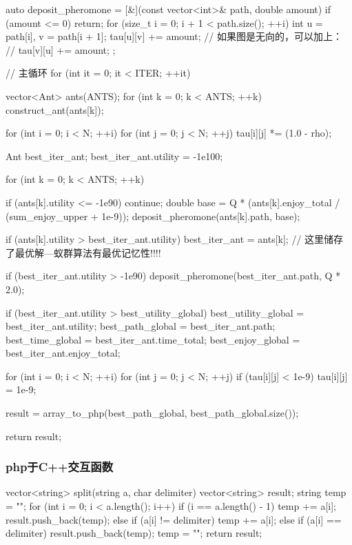 \documentclass[withoutpreface,bwprint]{cumcmthesis} %
\begin{document}
\begin{appendices}
\begin{tcode}
{    auto deposit_pheromone = [&](const vector<int>& path, double amount) {
        if (amount <= 0) return;
        for (size_t i = 0; i + 1 < path.size(); ++i) {
            int u = path[i], v = path[i + 1];
            tau[u][v] += amount;
            // 如果图是无向的，可以加上：
            // tau[v][u] += amount;
        }
        };

    // 主循环
    for (int it = 0; it < ITER; ++it) {
        vector<Ant> ants(ANTS);
        for (int k = 0; k < ANTS; ++k) {
            construct_ant(ants[k]);
        }

        for (int i = 0; i < N; ++i)
            for (int j = 0; j < N; ++j)
                tau[i][j] *= (1.0 - rho);

        Ant best_iter_ant;
        best_iter_ant.utility = -1e100;

        for (int k = 0; k < ANTS; ++k) {
            if (ants[k].utility <= -1e90) continue;
            double base = Q * (ants[k].enjoy_total / (sum_enjoy_upper + 1e-9));
            deposit_pheromone(ants[k].path, base);

            if (ants[k].utility > best_iter_ant.utility) best_iter_ant = ants[k];
            // 这里储存了最优解---蚁群算法有最优记忆性!!!!
        }

        if (best_iter_ant.utility > -1e90) {
            deposit_pheromone(best_iter_ant.path, Q * 2.0);
        }

        if (best_iter_ant.utility > best_utility_global) {
            best_utility_global = best_iter_ant.utility;
            best_path_global = best_iter_ant.path;
            best_time_global = best_iter_ant.time_total;
            best_enjoy_global = best_iter_ant.enjoy_total;
        }

        for (int i = 0; i < N; ++i)
            for (int j = 0; j < N; ++j)
                if (tau[i][j] < 1e-9) tau[i][j] = 1e-9;
    }
    result = array_to_php(best_path_global, best_path_global.size());
    
    return result;
}
\end{tcode}

\subsubsection{php于C++交互函数}

\begin{tcode}
vector<string> split(string a, char delimiter) {
    vector<string> result;
    string temp = "";
    for (int i = 0; i < a.length(); i++) {
        if (i == a.length() - 1) {
            temp += a[i];
            result.push_back(temp);
        }
        else if (a[i] != delimiter) {
            temp += a[i];
        }
        else if (a[i] == delimiter) {
            result.push_back(temp);
            temp = "";
        }
    }
    return result;
}


\end{tcode}
\end{appendices}
\end{document}
